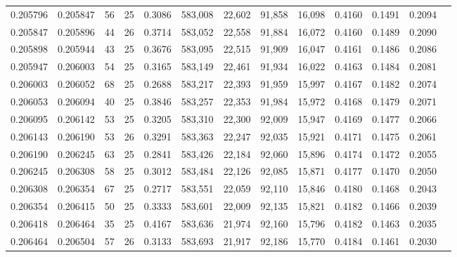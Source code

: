 \begin{tabular}{rrrrrrrrrrrrr}
0.205796 & 0.205847 &  56 &  25 &                                     0.3086 & 583,008 &  22,602 &  91,858 &  16,098 & 0.4160 & 0.1491 & 0.2094 \\
0.205847 & 0.205896 &  44 &  26 &                                     0.3714 & 583,052 &  22,558 &  91,884 &  16,072 & 0.4160 & 0.1489 & 0.2090 \\
0.205898 & 0.205944 &  43 &  25 &                                     0.3676 & 583,095 &  22,515 &  91,909 &  16,047 & 0.4161 & 0.1486 & 0.2086 \\
0.205947 & 0.206003 &  54 &  25 &                                     0.3165 & 583,149 &  22,461 &  91,934 &  16,022 & 0.4163 & 0.1484 & 0.2081 \\
0.206003 & 0.206052 &  68 &  25 &                                     0.2688 & 583,217 &  22,393 &  91,959 &  15,997 & 0.4167 & 0.1482 & 0.2074 \\
0.206053 & 0.206094 &  40 &  25 &                                     0.3846 & 583,257 &  22,353 &  91,984 &  15,972 & 0.4168 & 0.1479 & 0.2071 \\
0.206095 & 0.206142 &  53 &  25 &                                     0.3205 & 583,310 &  22,300 &  92,009 &  15,947 & 0.4169 & 0.1477 & 0.2066 \\
0.206143 & 0.206190 &  53 &  26 &                                     0.3291 & 583,363 &  22,247 &  92,035 &  15,921 & 0.4171 & 0.1475 & 0.2061 \\
0.206190 & 0.206245 &  63 &  25 &                                     0.2841 & 583,426 &  22,184 &  92,060 &  15,896 & 0.4174 & 0.1472 & 0.2055 \\
0.206245 & 0.206308 &  58 &  25 &                                     0.3012 & 583,484 &  22,126 &  92,085 &  15,871 & 0.4177 & 0.1470 & 0.2050 \\
0.206308 & 0.206354 &  67 &  25 &                                     0.2717 & 583,551 &  22,059 &  92,110 &  15,846 & 0.4180 & 0.1468 & 0.2043 \\
0.206354 & 0.206415 &  50 &  25 &                                     0.3333 & 583,601 &  22,009 &  92,135 &  15,821 & 0.4182 & 0.1466 & 0.2039 \\
0.206418 & 0.206464 &  35 &  25 &                                     0.4167 & 583,636 &  21,974 &  92,160 &  15,796 & 0.4182 & 0.1463 & 0.2035 \\
0.206464 & 0.206504 &  57 &  26 &                                     0.3133 & 583,693 &  21,917 &  92,186 &  15,770 & 0.4184 & 0.1461 & 0.2030 \\

\end{tabular}
